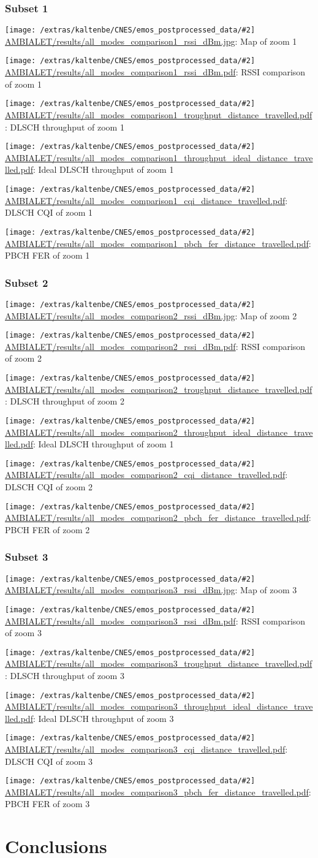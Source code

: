 \documentclass[a4paper,10pt]{article}
\newcommand{\printfile}[2][]{
 \begin{minipage}{8cm}
  \centering
  \texttt{[image: /extras/kaltenbe/CNES/emos\_postprocessed\_data/\#2]}
  \url{#2}: #1

 \end{minipage}
}
\begin{document}
\subsubsection*{Subset 1}

\printfile[Map of zoom 1]{AMBIALET/results/all_modes_comparison1_rssi_dBm.jpg}
\printfile[RSSI comparison of zoom 1]{AMBIALET/results/all_modes_comparison1_rssi_dBm.pdf}

\printfile[DLSCH throughput of zoom 1]{AMBIALET/results/all_modes_comparison1_troughput_distance_travelled.pdf}
\printfile[Ideal DLSCH throughput of zoom 1]{AMBIALET/results/all_modes_comparison1_throughput_ideal_distance_travelled.pdf}

\printfile[DLSCH CQI of zoom 1]{AMBIALET/results/all_modes_comparison1_cqi_distance_travelled.pdf}
\printfile[PBCH FER of zoom 1]{AMBIALET/results/all_modes_comparison1_pbch_fer_distance_travelled.pdf}

\subsubsection*{Subset 2}

\printfile[Map of zoom 2]{AMBIALET/results/all_modes_comparison2_rssi_dBm.jpg}
\printfile[RSSI comparison of zoom 2]{AMBIALET/results/all_modes_comparison2_rssi_dBm.pdf}

\printfile[DLSCH throughput of zoom 2]{AMBIALET/results/all_modes_comparison2_troughput_distance_travelled.pdf}
\printfile[Ideal DLSCH throughput of zoom 1]{AMBIALET/results/all_modes_comparison2_throughput_ideal_distance_travelled.pdf}

\printfile[DLSCH CQI of zoom 2]{AMBIALET/results/all_modes_comparison2_cqi_distance_travelled.pdf}
\printfile[PBCH FER of zoom 2]{AMBIALET/results/all_modes_comparison2_pbch_fer_distance_travelled.pdf}

\subsubsection*{Subset 3}

\printfile[Map of zoom 3]{AMBIALET/results/all_modes_comparison3_rssi_dBm.jpg}
\printfile[RSSI comparison of zoom 3]{AMBIALET/results/all_modes_comparison3_rssi_dBm.pdf}

\printfile[DLSCH throughput of zoom 3]{AMBIALET/results/all_modes_comparison3_troughput_distance_travelled.pdf}
\printfile[Ideal DLSCH throughput of zoom 3]{AMBIALET/results/all_modes_comparison3_throughput_ideal_distance_travelled.pdf}

\printfile[DLSCH CQI of zoom 3]{AMBIALET/results/all_modes_comparison3_cqi_distance_travelled.pdf}
\printfile[PBCH FER of zoom 3]{AMBIALET/results/all_modes_comparison3_pbch_fer_distance_travelled.pdf}


\section{Conclusions}


 

\end{document}
